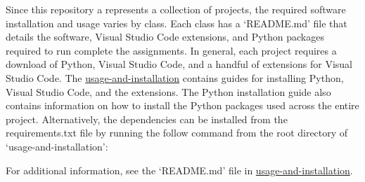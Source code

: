 Since this repository a represents a collection of projects, the required software 
installation and usage varies by class. Each class has a `README.md' file that details 
the software, Visual Studio Code extensions, and Python packages required to run complete 
the assignments. In general, each project requires a download of Python, Visual Studio 
Code, and a handful of extensions for Visual Studio Code. The 
\href{https://github.com/mKiloLA/python-based-mne/tree/develop/usage-and-installation}{usage-and-installation} 
contains guides for installing Python, Visual Studio Code, and the extensions. 
The Python installation guide also contains information on how to install the Python 
packages used across the entire project. Alternatively, the dependencies can be 
installed from the requirements.txt file by running the follow command from the root 
directory of `usage-and-installation':

\begin{center}
\end{center}
For additional information, see the `README.md' file in \href{https://github.com/mKiloLA/python-based-mne/tree/develop/usage-and-installation}{usage-and-installation}.
